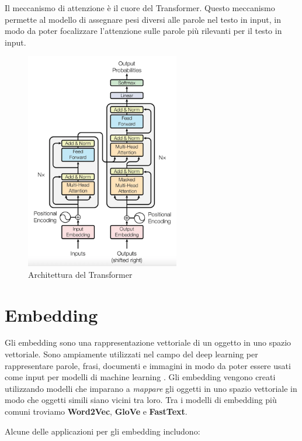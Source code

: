 Il meccanismo di attenzione è il cuore del Transformer.
Questo meccanismo permette al modello di assegnare pesi
diversi alle parole nel testo in input, in modo da poter
focalizzare l'attenzione sulle parole più rilevanti per il
testo in input.

\begin{figure}[H]
  \centering
  \includegraphics[width=0.6\textwidth]{res/transformer.png}
  \caption{Architettura del Transformer}
  \label{fig:transformer-architecture}
\end{figure}

\section{Embedding}
\label{sec:embedding}
Gli embedding sono una rappresentazione vettoriale di un
oggetto in uno spazio vettoriale.
Sono ampiamente utilizzati nel campo del deep learning per
rappresentare parole, frasi, documenti e immagini in modo
da poter essere usati come input per modelli di machine
learning \cite{mikolov2013efficient}.
Gli embedding vengono creati utilizzando modelli che
imparano a \textit{mappare} gli oggetti in uno spazio
vettoriale in modo che oggetti simili siano vicini tra
loro.
Tra i modelli di embedding più comuni troviamo
\textbf{Word2Vec}, \textbf{GloVe} e \textbf{FastText}.

Alcune delle applicazioni per gli embedding includono:

